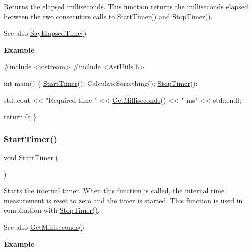 Returns the elapsed milliseconds. This function returns the milliseconds elapsed between the two consecutive calls to \hyperlink{group__timer__group_ga66509b494102a5c28ba6c8be3eab7733}{Start\+Timer()} and \hyperlink{group__timer__group_gaf3619f34a9bc0184b4578e5337069856}{Stop\+Timer()}.

\begin{DoxySeeAlso}{See also}
\hyperlink{group__io__group_ga9988545ab3fddd93e05654323cdb1f4b}{Say\+Elapsed\+Time()}
\end{DoxySeeAlso}
{\bfseries Example}


\begin{DoxyCode}
\textcolor{preprocessor}{#include <iostream>}
\textcolor{preprocessor}{#include <AstUtils.h>}

\textcolor{keywordtype}{int} main()
\{
  \hyperlink{group__timer__group_ga66509b494102a5c28ba6c8be3eab7733}{StartTimer}();
  CalculateSomething();
  \hyperlink{group__timer__group_gaf3619f34a9bc0184b4578e5337069856}{StopTimer}();

  std::cout << \textcolor{stringliteral}{"Required time "} << \hyperlink{group__timer__group_ga0c820f6552d69b3cdaac23e6b4662d7a}{GetMilliseconds}() << \textcolor{stringliteral}{" ms"} << std::endl;

  \textcolor{keywordflow}{return} 0;
\}
\end{DoxyCode}
 \mbox{\label{group__timer__group_ga66509b494102a5c28ba6c8be3eab7733}} 
\subsubsection{\texorpdfstring{Start\+Timer()}{StartTimer()}}
{\footnotesize\ttfamily void Start\+Timer (\begin{DoxyParamCaption}{ }\end{DoxyParamCaption})}

Starts the internal timer. When this function is called, the internal time measurement is reset to zero and the timer is started. This function is used in combination with \hyperlink{group__timer__group_gaf3619f34a9bc0184b4578e5337069856}{Stop\+Timer()}.

\begin{DoxySeeAlso}{See also}
\hyperlink{group__timer__group_ga0c820f6552d69b3cdaac23e6b4662d7a}{Get\+Milliseconds()}
\end{DoxySeeAlso}
{\bfseries Example}



